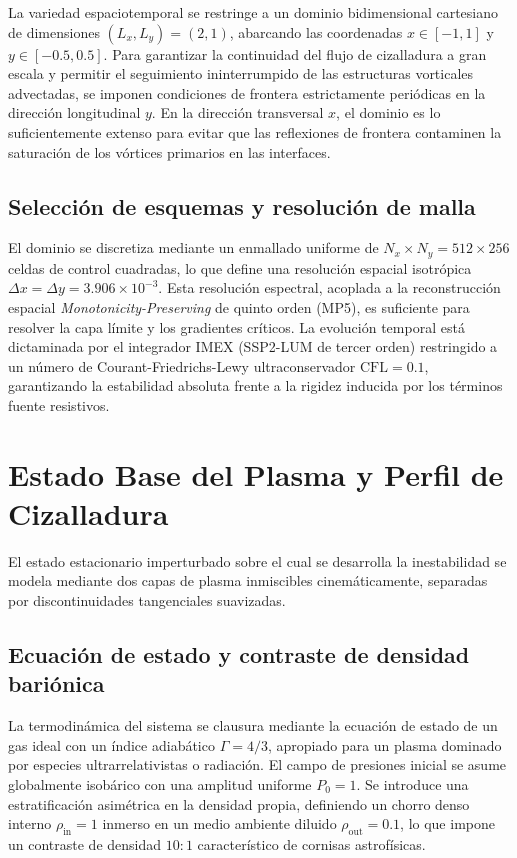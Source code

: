 \primerparrafo La variedad espaciotemporal se restringe a un dominio bidimensional cartesiano de dimensiones $(L_x, L_y) = (2, 1)$, abarcando las coordenadas $x \in [-1, 1]$ y $y \in [-0.5, 0.5]$. Para garantizar la continuidad del flujo de cizalladura a gran escala y permitir el seguimiento ininterrumpido de las estructuras vorticales advectadas, se imponen condiciones de frontera estrictamente periódicas en la dirección longitudinal $y$. En la dirección transversal $x$, el dominio es lo suficientemente extenso para evitar que las reflexiones de frontera contaminen la saturación de los vórtices primarios en las interfaces.

\subsection{Selección de esquemas y resolución de malla}

\primerparrafo El dominio se discretiza mediante un enmallado uniforme de $N_x \times N_y = 512 \times 256$ celdas de control cuadradas, lo que define una resolución espacial isotrópica $\Delta x = \Delta y = 3.906 \times 10^{-3}$. Esta resolución espectral, acoplada a la reconstrucción espacial \textit{Monotonicity-Preserving} de quinto orden (MP5), es suficiente para resolver la capa límite y los gradientes críticos. La evolución temporal está dictaminada por el integrador IMEX (SSP2-LUM de tercer orden) restringido a un número de Courant-Friedrichs-Lewy ultraconservador $\text{CFL} = 0.1$, garantizando la estabilidad absoluta frente a la rigidez inducida por los términos fuente resistivos.

\section{Estado Base del Plasma y Perfil de Cizalladura}

\primerparrafo El estado estacionario imperturbado sobre el cual se desarrolla la inestabilidad se modela mediante dos capas de plasma inmiscibles cinemáticamente, separadas por discontinuidades tangenciales suavizadas.

\subsection{Ecuación de estado y contraste de densidad bariónica}

\primerparrafo La termodinámica del sistema se clausura mediante la ecuación de estado de un gas ideal con un índice adiabático $\Gamma = 4/3$, apropiado para un plasma dominado por especies ultrarrelativistas o radiación. El campo de presiones inicial se asume globalmente isobárico con una amplitud uniforme $P_0 = 1$. Se introduce una estratificación asimétrica en la densidad propia, definiendo un chorro denso interno $\rho_{\text{in}} = 1$ inmerso en un medio ambiente diluido $\rho_{\text{out}} = 0.1$, lo que impone un contraste de densidad $10:1$ característico de cornisas astrofísicas.

